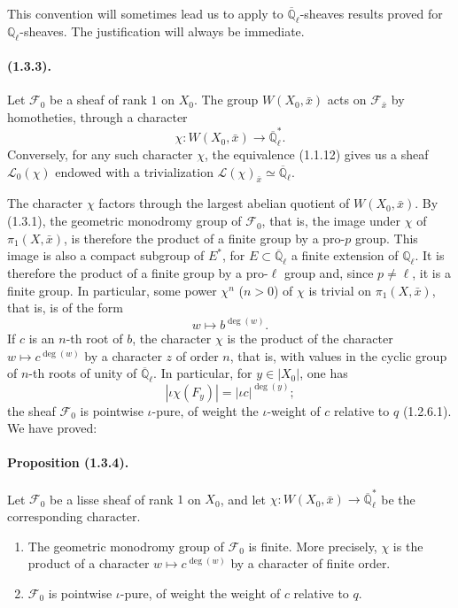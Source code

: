 \documentclass[11pt]{article}
\theoremstyle{remark}
\newcommand{\Ql}{\mathbb{Q}_\ell}
\newcommand{\Qlb}{\overline{\mathbb{Q}}_\ell}
\begin{document}
This convention will sometimes lead us to apply to $\Qlb$-sheaves results proved for $\Ql$-sheaves. The justification will always be immediate.

\paragraph{(1.3.3).} Let $\mathcal F_0$ be a sheaf of rank $1$ on $X_0$. The group $W(X_0,\bar x)$ acts on $\mathcal F_{\bar x}$ by homotheties, through a character
\[
\chi:W(X_0,\bar x)\longrightarrow \Qlb^*.
\]
Conversely, for any such character $\chi$, the equivalence (1.1.12) gives us a sheaf $\mathcal L_0(\chi)$ endowed with a trivialization $\mathcal L(\chi)_{\bar x}\simeq\Qlb$.

The character $\chi$ factors through the largest abelian quotient of $W(X_0,\bar x)$. By (1.3.1), the geometric monodromy group of $\mathcal F_0$, that is, the image under $\chi$ of $\pi_1(X,\bar x)$, is therefore the product of a finite group by a pro-$p$ group. This image is also a compact subgroup of $E^*$, for $E\subset\Qlb$ a finite extension of $\Ql$. It is therefore the product of a finite group by a pro-$\ell$ group and, since $p\ne\ell$, it is a finite group. In particular, some power $\chi^n$ ($n>0$) of $\chi$ is trivial on $\pi_1(X,\bar x)$, that is, is of the form
\[
 w\longmapsto b^{\deg(w)}.
\]
If $c$ is an $n$-th root of $b$, the character $\chi$ is the product of the character $w\mapsto c^{\deg(w)}$ by a character $z$ of order $n$, that is, with values in the cyclic group of $n$-th roots of unity of $\Qlb$. In particular, for $y\in |X_0|$, one has
\[
 |\iota\chi(F_y)|=|\iota c|^{\deg(y)};
\]
the sheaf $\mathcal F_0$ is pointwise $\iota$-pure, of weight the $\iota$-weight of $c$ relative to $q$ (1.2.6.1). We have proved:

\paragraph{Proposition (1.3.4).} Let $\mathcal F_0$ be a lisse sheaf of rank $1$ on $X_0$, and let
$\chi:W(X_0,\bar x)\to\Qlb^*$ be the corresponding character.
\begin{enumerate}[label=(\roman*)]
\item The geometric monodromy group of $\mathcal F_0$ is finite. More precisely, $\chi$ is the product of a character $w\mapsto c^{\deg(w)}$ by a character of finite order.
\item $\mathcal F_0$ is pointwise $\iota$-pure, of weight the weight of $c$ relative to $q$.
\end{enumerate}
\end{document}
